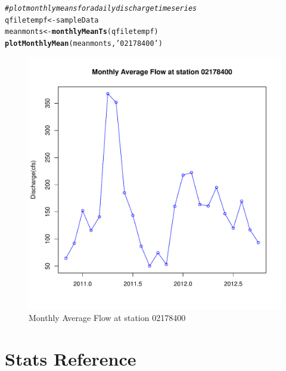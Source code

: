 \documentclass[a4paper,11pt]{article}\usepackage[]{graphicx}\usepackage[]{color}
\makeatletter
\def\maxwidth{ %
  \ifdim\Gin@nat@width>\linewidth
    \linewidth
  \else
    \Gin@nat@width
  \fi
}
\newcommand{\hlstr}[1]{\textcolor[rgb]{0.192,0.494,0.8}{#1}}%
\newcommand{\hlcom}[1]{\textcolor[rgb]{0.678,0.584,0.686}{\textit{#1}}}%
\newcommand{\hlstd}[1]{\textcolor[rgb]{0.345,0.345,0.345}{#1}}%
\newcommand{\hlkwb}[1]{\textcolor[rgb]{0.69,0.353,0.396}{#1}}%
\newcommand{\hlkwd}[1]{\textcolor[rgb]{0.737,0.353,0.396}{\textbf{#1}}}%
\newenvironment{kframe}{%
 \def\at@end@of@kframe{}%
 \ifinner\ifhmode%
  \def\at@end@of@kframe{\end{minipage}}%
  \begin{minipage}{\columnwidth}%
 \fi\fi%
 \def\FrameCommand##1{\hskip\@totalleftmargin \hskip-\fboxsep
 \colorbox{shadecolor}{##1}\hskip-\fboxsep
     \hskip-\linewidth \hskip-\@totalleftmargin \hskip\columnwidth}%
 \MakeFramed {\advance\hsize-\width
   \@totalleftmargin\z@ \linewidth\hsize
   \@setminipage}}%
 {\par\unskip\endMakeFramed%
 \at@end@of@kframe}
\newenvironment{knitrout}{}{} %
\makeatother
\begin{document}
\begin{knitrout}
\color{fgcolor}\begin{kframe}
\begin{alltt}
\hlcom{# plot monthly means for a daily discharge timeseries}
\hlstd{qfiletempf}\hlkwb{<-}\hlstd{sampleData}
\hlstd{meanmonts}\hlkwb{<-}\hlkwd{monthlyMeanTs}\hlstd{(qfiletempf)}
\hlkwd{plotMonthlyMean}\hlstd{(meanmonts,}\hlstr{'02178400'}\hlstd{)}
\end{alltt}
\end{kframe}\begin{figure}[]

\includegraphics[width=\maxwidth]{figure/plotMonthlyMeans} \caption[Monthly Average Flow at station 02178400]{Monthly Average Flow at station 02178400\label{fig:plotMonthlyMeans}}
\end{figure}


\end{knitrout}


\FloatBarrier

\section{Stats Reference}
\label{sec:reference}
\end{document}
